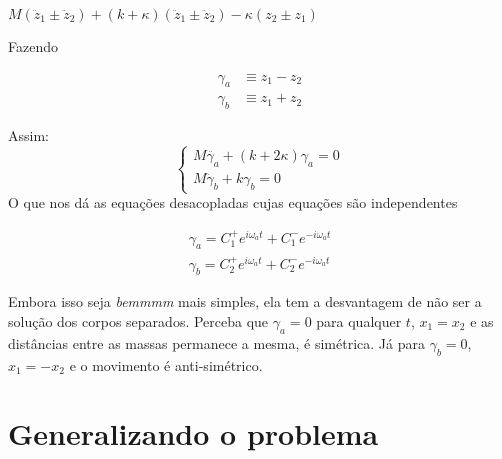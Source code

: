 \documentclass[11pt]{article}
\begin{document}
\(M(\ddot{z}_{1} \pm \ddot{z}_{2}) + (k + \kappa)(\ddot{z}_{1} \pm \ddot{z}_{2}) - \kappa(z_{2}
\pm z_{1})\)

Fazendo

\begin{align}
\gamma_{a} &\equiv z_{1} - z_{2} \\
\gamma_{b} &\equiv z_{1} + z_{2}
\end{align}

Assim:
\[\begin{cases}
 M\ddot{\gamma_{a}} + (k + 2\kappa)\gamma_{a} = 0\\
 M\ddot{\gamma}_{b} + k\gamma_{b} = 0 
\end{cases}\]
O que nos dá as equações desacopladas cujas equações são independentes

\begin{align}
  \gamma_{a} = C_{1}^{+ } e^{i\omega_{a}t} + C_{1}^{-}e^{-i\omega_{a}t}\\ 
  \gamma_{b} = C_{2}^{+} e^{i\omega_{a}t} + C_{2}^{-}e^{-i\omega_{a}t}
\end{align}

Embora isso seja \emph{bemmmm} mais simples, ela tem a desvantagem de não ser a
solução dos corpos separados. Perceba que \(\gamma_{a} = 0\) para qualquer \(t\), \(x_{1}
= x_{2}\) e as distâncias entre as massas permanece a mesma, é simétrica. Já para \(\gamma_{b} = 0\), \(x_{1} = -x_{2}\) e o
movimento é anti-simétrico.

\section{Generalizando o problema}
\label{sec:org03829cc}
\end{document}
